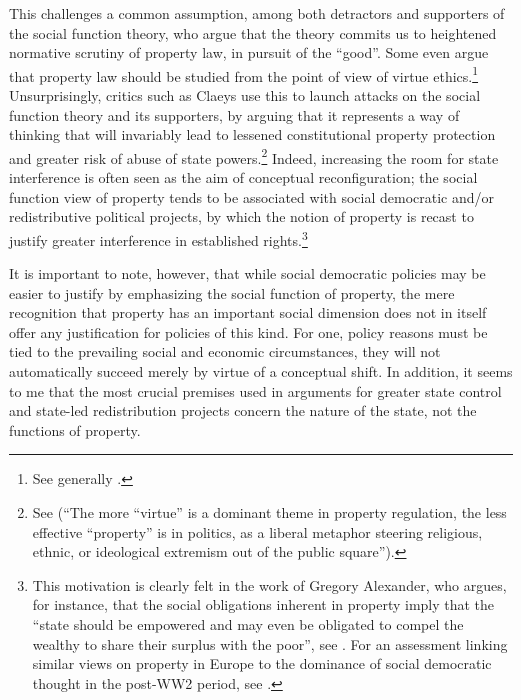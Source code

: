 This challenges a common assumption, among both detractors and supporters of the social function theory, who argue that the theory commits us to heightened normative scrutiny of property law, in pursuit of the ``good''. Some even argue that property law should be studied from the point of view of virtue ethics.\footnote{See generally \cite{penalver09}.} Unsurprisingly, critics such as Claeys use this to launch attacks on the social function theory and its supporters, by arguing that it represents a way of thinking that will invariably lead to lessened constitutional property protection and greater risk of abuse of state powers.\footnote{See \cite{claeys09} (``The more ``virtue'' is a dominant theme in property regulation, the less effective ``property'' is in politics, as a liberal metaphor steering religious, ethnic, or ideological extremism out of the public square'').} Indeed, increasing the room for state interference is often seen as the aim of conceptual reconfiguration; the social function view of property tends to be associated with social democratic and/or redistributive political projects, by which the notion of property is recast to justify greater interference in established rights.\footnote{This motivation is clearly felt in the work of Gregory Alexander, who argues, for instance, that the social obligations inherent in property imply that the ``state should be empowered and may even be obligated to compel the wealthy to share their surplus with the poor'', see \cite[746]{alexander09}. For an assessment linking similar views on property in Europe to the dominance of social democratic thought in the post-WW2 period, see \cite{allen10}.}

It is important to note, however, that while social democratic policies may be easier to justify by emphasizing the social function of property, the mere recognition that property has an important social dimension does not in itself offer any justification for policies of this kind. For one, policy reasons must be tied to the prevailing social and economic circumstances, they will not automatically succeed merely by virtue of a conceptual shift. In addition, it seems to me that the most crucial premises used in arguments for greater state control and state-led redistribution projects concern the nature of the state, not the functions of property.

